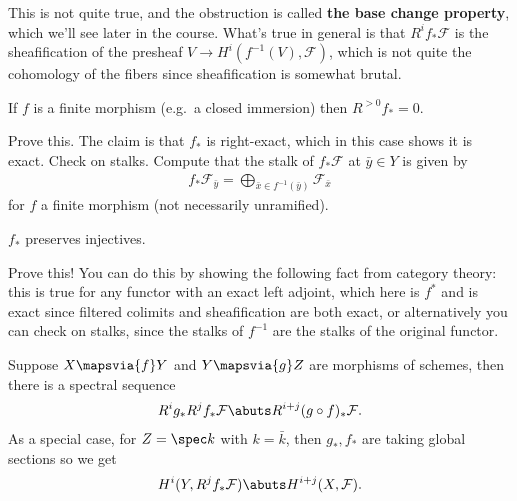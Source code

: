 This is not quite true, and the obstruction is called \textbf{the base
change property}, which we'll see later in the course. What's true in
general is that \(R^i f_* \mathcal{F}\) is the sheafification of the
presheaf \(V\to H^i(f^{-1}(V), \mathcal{F})\), which is not quite the
cohomology of the fibers since sheafification is somewhat brutal.

\begin{proposition}

If \(f\) is a finite morphism (e.g.~a closed immersion) then
\(R^{>0} f_* = 0\).

\end{proposition}

\begin{exercise}

Prove this. The claim is that \(f_*\) is right-exact, which in this case
shows it is exact. Check on stalks. Compute that the stalk of
\(f_* \mathcal{F}\) at \(\bar y\in Y\) is given by
\begin{align*}
f_* \mathcal{F}_{\bar y} = \bigoplus_{\bar x\in f^{-1}(\bar y)}\mathcal{F}_{\bar x}
\end{align*} for \(f\) a finite morphism (not necessarily unramified).

\end{exercise}

\begin{proposition}[technical]

\(f_*\) preserves injectives.

\end{proposition}

\begin{exercise}[proof]

Prove this! You can do this by showing the following fact from category
theory: this is true for any functor with an exact left adjoint, which
here is \(f^*\) and is exact since filtered colimits and sheafification
are both exact, or alternatively you can check on stalks, since the
stalks of \(f^{-1}\) are the stalks of the original functor.

\end{exercise}

\begin{corollary}

Suppose \(X \mapsvia{f} Y\) and \(Y \mapsvia{g} Z\) are morphisms of
schemes, then there is a spectral sequence
\begin{align*}  
R^i g_* R^j f_* \mathcal{F} \abuts R^{i+j}(g\circ f)_* \mathcal{F}
.\end{align*} As a special case, for \(Z = \spec k\) with \(k=\bar k\),
then \(g_*, f_*\) are taking global sections so we get
\begin{align*}  
H^i(Y, R^j f_* \mathcal{F} ) \abuts H^{i+j}(X, \mathcal{F})
.\end{align*}

\end{corollary}

